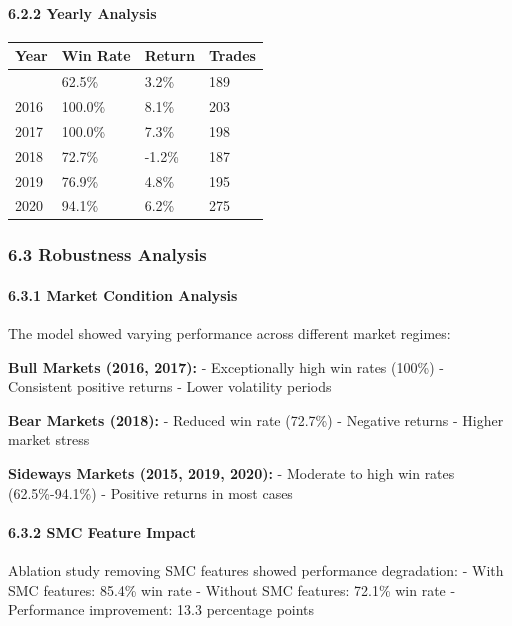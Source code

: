 \paragraph{6.2.2 Yearly Analysis}\label{yearly-analysis}

\begin{longtable}[]{@{}llll@{}}
\toprule\noalign{}
Year & Win Rate & Return & Trades \\
\midrule\noalign{}
\endhead
\bottomrule\noalign{}
\endlastfoot
2015 & 62.5\% & 3.2\% & 189 \\
2016 & 100.0\% & 8.1\% & 203 \\
2017 & 100.0\% & 7.3\% & 198 \\
2018 & 72.7\% & -1.2\% & 187 \\
2019 & 76.9\% & 4.8\% & 195 \\
2020 & 94.1\% & 6.2\% & 275 \\
\end{longtable}

\subsubsection{6.3 Robustness Analysis}\label{robustness-analysis}

\paragraph{6.3.1 Market Condition
Analysis}\label{market-condition-analysis}

The model showed varying performance across different market regimes:

\textbf{Bull Markets (2016, 2017):} - Exceptionally high win rates
(100\%) - Consistent positive returns - Lower volatility periods

\textbf{Bear Markets (2018):} - Reduced win rate (72.7\%) - Negative
returns - Higher market stress

\textbf{Sideways Markets (2015, 2019, 2020):} - Moderate to high win
rates (62.5\%-94.1\%) - Positive returns in most cases

\paragraph{6.3.2 SMC Feature Impact}\label{smc-feature-impact}

Ablation study removing SMC features showed performance degradation: -
With SMC features: 85.4\% win rate - Without SMC features: 72.1\% win
rate - Performance improvement: 13.3 percentage points

